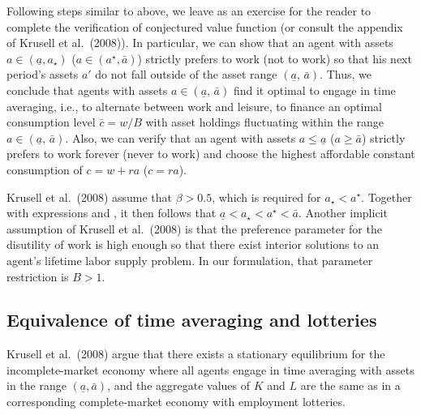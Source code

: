 Following steps similar to above, we leave as an exercise for the
reader to complete the verification of conjectured value function
 (or consult the appendix
of Krusell et al.\ (2008)). In
particular, we can show that an agent with assets
$a\in (\underline{a}, a_{\star})$ ($a\in (a^{\star}, \bar a)$)
strictly prefers to work (not to work)
so that his next period's assets $a'$ do not fall outside of the
asset range $(\underline{a},\, \bar a)$. Thus, we conclude
that agents with assets $a\in (\underline{a},\, \bar a)$ find
it optimal to engage in time averaging, i.e., to alternate between
work and leisure, to finance an optimal consumption level
$\bar c= w/B$ with asset holdings fluctuating within the
range $a\in (\underline{a},\, \bar a)$. Also, we can verify
that an agent with assets $a\leq \underline{a}$
($a\geq \bar a$) strictly prefers to work forever
(never to work) and choose the highest affordable constant
consumption of $c=w+ra$ ($c=ra$).

Krusell et al.\ (2008) assume that
$\beta > 0.5$, which is required for
$a_{\star} < a^{\star}$.
Together with expressions  and
, it then follows that
$\underline{a} < a_{\star} < a^{\star} < \bar a$.
Another implicit assumption of Krusell et al.\ (2008) is
that the preference parameter for the disutility of work
is high enough so that there exist interior solutions to an
agent's lifetime labor supply problem. In our formulation, that
parameter restriction is $B>1$.



\subsection{Equivalence of time averaging and lotteries}

Krusell et al.\ (2008) argue that there exists a stationary
equilibrium for the incomplete-market economy where
all agents engage in time averaging with assets in the range
$(\underline{a}, \bar a)$, and the aggregate values of
$K$ and $L$ are the same as in a corresponding
complete-market economy with employment lotteries.

